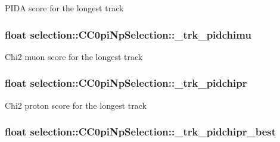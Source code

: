 P\-I\-D\-A score for the longest track \hypertarget{classselection_1_1CC0piNpSelection_a74ddf5622f3ee32110e9342361020a89}{
\subsubsection[{\-\_\-trk\-\_\-pidchimu}]{\setlength{\rightskip}{0pt plus 5cm}float selection\-::\-C\-C0pi\-Np\-Selection\-::\-\_\-trk\-\_\-pidchimu\hspace{0.3cm}{\ttfamily [private]}}}\label{classselection_1_1CC0piNpSelection_a74ddf5622f3ee32110e9342361020a89}
Chi2 muon score for the longest track \hypertarget{classselection_1_1CC0piNpSelection_a712eaf6dc6086f1be5705a3bbe5226fc}{
\subsubsection[{\-\_\-trk\-\_\-pidchipr}]{\setlength{\rightskip}{0pt plus 5cm}float selection\-::\-C\-C0pi\-Np\-Selection\-::\-\_\-trk\-\_\-pidchipr\hspace{0.3cm}{\ttfamily [private]}}}\label{classselection_1_1CC0piNpSelection_a712eaf6dc6086f1be5705a3bbe5226fc}
Chi2 proton score for the longest track \hypertarget{classselection_1_1CC0piNpSelection_aaf0a2841494bc52da55d267bc3c8db3d}{
\subsubsection[{\-\_\-trk\-\_\-pidchipr\-\_\-best}]{\setlength{\rightskip}{0pt plus 5cm}float selection\-::\-C\-C0pi\-Np\-Selection\-::\-\_\-trk\-\_\-pidchipr\-\_\-best\hspace{0.3cm}{\ttfamily [private]}}}\label{classselection_1_1CC0piNpSelection_aaf0a2841494bc52da55d267bc3c8db3d}
